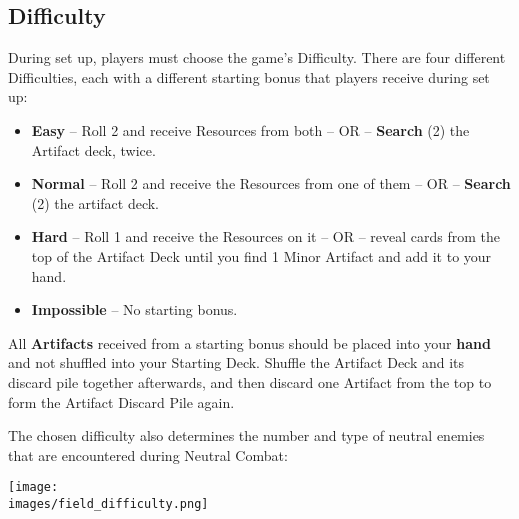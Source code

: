\subsection*{\hypertarget{Difficulty}{Difficulty}}
During set up, players must choose the game’s Difficulty.
There are four different Difficulties, each with a different starting bonus that players receive during set up:
\begin{itemize}
  \item \textbf{Easy} – Roll 2  and receive Resources from both – OR – \textbf{Search} (2) the Artifact deck, twice.
  \item \textbf{Normal} – Roll 2  and receive the Resources from one of them – OR – \textbf{Search} (2) the artifact deck.
  \item \textbf{Hard} – Roll 1  and receive the Resources on it – OR – reveal cards from the top of the Artifact Deck until you find 1 Minor Artifact and add it to your hand.
  \item \textbf{Impossible} – No starting bonus.
\end{itemize}
All \textbf{Artifacts} received from a starting bonus should be placed into your \textbf{hand} and not shuffled into your Starting Deck.
Shuffle the Artifact Deck and its discard pile together afterwards, and then discard one Artifact from the top to form the Artifact Discard Pile again.\par
The chosen difficulty also determines the number and type of neutral enemies that are encountered during Neutral Combat:
\begin{center}
\texttt{[image: \\images/field\_difficulty.png]}
\end{center}
